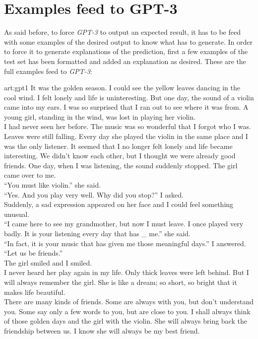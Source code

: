 
\chapter{Examples feed to GPT-3}
\label{ch:GPT3-Examples}
\noindent As said before, to force \emph{GPT-3} to output an expected result, it has to be feed with some examples of the desired output to know what has to generate. In order to force it to generate explanations of the prediction, first a few examples of the test set has been formatted and added an explanation as desired. These are the full examples feed to \emph{GPT-3}:

\begin{passage}{art:gpt1}
 It was the golden season. I could see the yellow leaves dancing in the cool wind. I felt lonely and life is uninteresting. But one day, the sound of a violin came into my ears. I was so surprised that I ran out to see where it was from. A young girl, standing in the wind, was lost in playing her violin. \\
I had never seen her before. The music was so wonderful that I forgot who I was. \\
Leaves were still falling. Every day she played the violin in the same place and I was the only listener. It seemed that I no longer felt lonely and life became interesting. We didn't know each other, but I thought we were already good friends.
One day, when I was listening, the sound suddenly stopped. The girl came over to me. \\
``You must like violin.'' she said. \\
``Yes. And you play very well. Why did you stop?'' I asked. \\
Suddenly, a sad expression appeared on her face and I could feel something unusual. \\
``I came here to see my grandmother, but now I must leave. I once played very badly. It is your listening every day that has \_ me.'' she said. \\
``In fact, it is your music that has given me those meaningful days.'' I answered. ``Let us be friends.'' \\
The girl smiled and I smiled. \\
I never heard her play again in my life. Only thick leaves were left behind. But I will always remember the girl. She is like a dream; so short, so bright that it makes life beautiful. \\
There are many kinds of friends. Some are always with you, but don't understand you. Some say only a few words to you, but are close to you. I shall always think of those golden days and the girl with the violin. She will always bring back the friendship between us. I know she will always be my best friend.
\end{passage}
